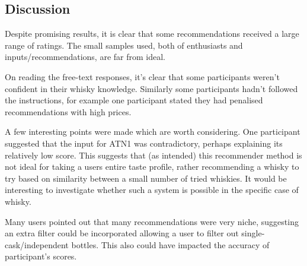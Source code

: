 \subsection{Discussion}\label{sec:disc}
Despite promising results, it is clear that some 
recommendations received a large range of ratings.  The small samples used, both of enthusiasts and 
inputs/recommendations, are far from ideal.

On reading the free-text responses, it's clear that some participants weren't confident
in their whisky knowledge. Similarly some participants hadn't followed the instructions, for example
one participant stated they had penalised recommendations with high prices.

A few interesting points were made which are worth considering.  One participant suggested that the input
for ATN1 was contradictory, perhaps explaining its relatively low score. This suggests that (as intended) this 
recommender method is not ideal for taking a users entire taste profile, 
rather recommending a whisky to try based on similarity between a small number of tried whiskies.  It would
be interesting to investigate whether such a system is possible in the specific case of whisky.

Many users pointed out that many recommendations were very niche, suggesting an extra filter could be
incorporated allowing a user to filter out single-cask/independent bottles.  This also could have impacted
the accuracy of participant's scores.